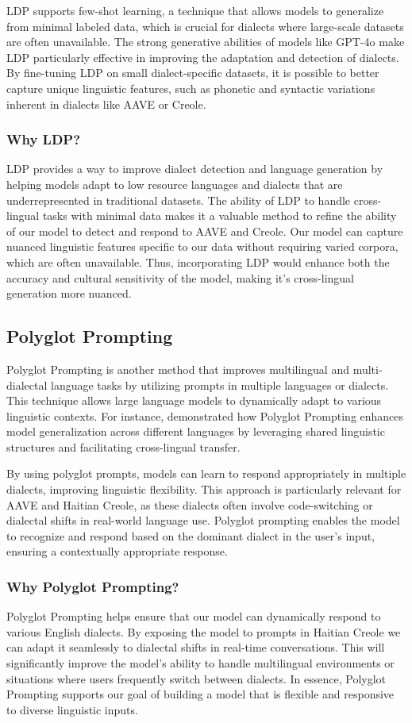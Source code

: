 LDP supports few-shot learning, a technique that allows models to generalize from minimal labeled data, which is crucial for dialects where large-scale datasets are often unavailable. The strong generative abilities of models like GPT-4o make LDP particularly effective in improving the adaptation and detection of dialects. By fine-tuning LDP on small dialect-specific datasets, it is possible to better capture unique linguistic features, such as phonetic and syntactic variations inherent in dialects like AAVE or Creole.

\subsubsection{Why LDP?} 
LDP provides a way to improve dialect detection and language generation by helping models adapt to low resource languages and dialects that are underrepresented in traditional datasets. The ability of LDP to handle cross-lingual tasks with minimal data makes it a valuable method to refine the ability of our model to detect and respond to AAVE and Creole. Our model can capture nuanced linguistic features specific to our data without requiring varied corpora, which are often unavailable. Thus, incorporating LDP would enhance both the accuracy and cultural sensitivity of the model, making it's cross-lingual generation more nuanced.

\subsection{Polyglot Prompting}
Polyglot Prompting is another method that improves multilingual and multi-dialectal language tasks by utilizing prompts in multiple languages or dialects. This technique allows large language models to dynamically adapt to various linguistic contexts. For instance, \cite{Ng:22} demonstrated how Polyglot Prompting enhances model generalization across different languages by leveraging shared linguistic structures and facilitating cross-lingual transfer.

By using polyglot prompts, models can learn to respond appropriately in multiple dialects, improving linguistic flexibility. This approach is particularly relevant for AAVE and Haitian Creole, as these dialects often involve code-switching or dialectal shifts in real-world language use. Polyglot prompting enables the model to recognize and respond based on the dominant dialect in the user’s input, ensuring a contextually appropriate response.

\subsubsection{Why Polyglot Prompting?}
Polyglot Prompting helps ensure that our model can dynamically respond to various English dialects. By exposing the model to prompts in Haitian Creole we can adapt it seamlessly to dialectal shifts in real-time conversations. This will significantly improve the model’s ability to handle multilingual environments or situations where users frequently switch between dialects. In essence, Polyglot Prompting supports our goal of building a model that is flexible and responsive to diverse linguistic inputs.